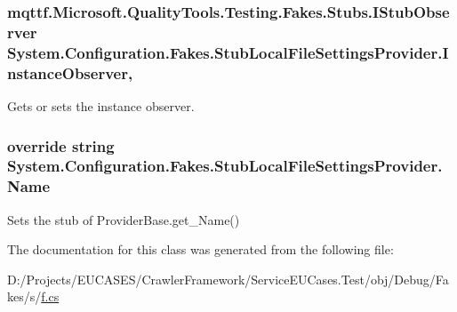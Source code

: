 \hypertarget{class_system_1_1_configuration_1_1_fakes_1_1_stub_local_file_settings_provider_aee72fe87e728cb382b5464f2f6a5353f}{
\subsubsection[{Instance\-Observer}]{\setlength{\rightskip}{0pt plus 5cm}mqttf.\-Microsoft.\-Quality\-Tools.\-Testing.\-Fakes.\-Stubs.\-I\-Stub\-Observer System.\-Configuration.\-Fakes.\-Stub\-Local\-File\-Settings\-Provider.\-Instance\-Observer\hspace{0.3cm}{\ttfamily [get]}, {\ttfamily [set]}}}\label{class_system_1_1_configuration_1_1_fakes_1_1_stub_local_file_settings_provider_aee72fe87e728cb382b5464f2f6a5353f}


Gets or sets the instance observer.

\hypertarget{class_system_1_1_configuration_1_1_fakes_1_1_stub_local_file_settings_provider_a76f22948c052d5f3c15f293357176c19}{
\subsubsection[{Name}]{\setlength{\rightskip}{0pt plus 5cm}override string System.\-Configuration.\-Fakes.\-Stub\-Local\-File\-Settings\-Provider.\-Name\hspace{0.3cm}{\ttfamily [get]}}}\label{class_system_1_1_configuration_1_1_fakes_1_1_stub_local_file_settings_provider_a76f22948c052d5f3c15f293357176c19}


Sets the stub of Provider\-Base.\-get\-\_\-\-Name()



The documentation for this class was generated from the following file\-:\begin{DoxyCompactItemize}
\item 
D\-:/\-Projects/\-E\-U\-C\-A\-S\-E\-S/\-Crawler\-Framework/\-Service\-E\-U\-Cases.\-Test/obj/\-Debug/\-Fakes/s/\hyperlink{s_2f_8cs}{f.\-cs}\end{DoxyCompactItemize}
